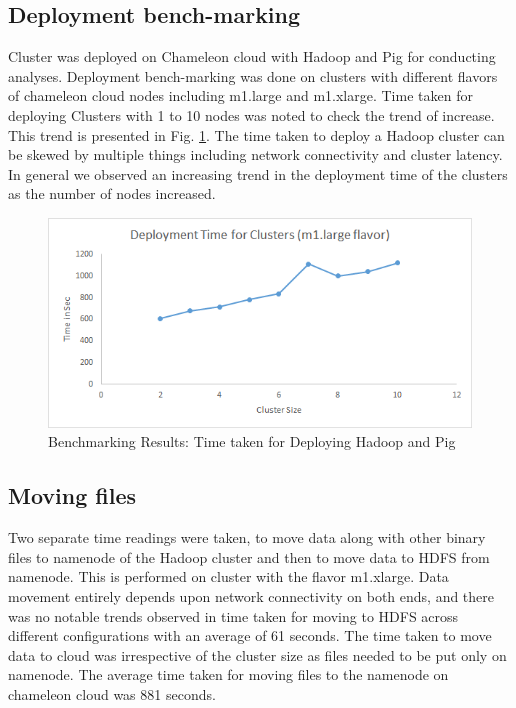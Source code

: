 \documentclass[9pt,twocolumn,twoside]{../../styles/osajnl}
\begin{document}
\subsection{Deployment bench-marking}
Cluster was deployed on Chameleon cloud with Hadoop and Pig for conducting analyses. Deployment bench-marking was done on clusters with different flavors of chameleon cloud nodes including m1.large and m1.xlarge. Time taken for deploying Clusters with 1 to 10 nodes was noted to check the trend of increase. This trend is presented in Fig. \ref{fig:dep_time}. The time taken to deploy a Hadoop cluster can be skewed by multiple things including network connectivity and cluster latency. In general we observed an increasing trend in the deployment time of the clusters as the number of nodes increased. 

\begin{figure}[hptb]
\centering
\includegraphics[width=\linewidth]{images/dep_time.png}
\caption{ Benchmarking Results: Time taken for Deploying Hadoop and Pig}
\label{fig:dep_time}
\end{figure}
\subsection{Moving files}
Two separate time readings were taken, to move data along with other binary files to namenode of the Hadoop cluster and then to move data to HDFS from namenode. This is performed on cluster with the flavor m1.xlarge. Data movement entirely depends upon network connectivity on both ends, and there was no notable trends observed in time taken for moving to HDFS across different configurations with an average of 61 seconds. The time taken to move data to cloud was irrespective of the cluster size as files needed to be put only on namenode. The average time taken for moving files to the namenode on chameleon cloud was 881 seconds. 
\end{document}
